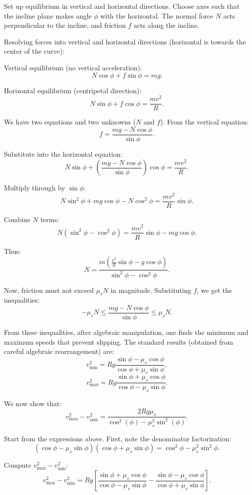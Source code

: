 \documentclass{article}
\begin{document}
Set up equilibrium in vertical and horizontal directions. Choose axes such that the incline plane makes angle $\phi$ with the horizontal. The normal force $N$ acts perpendicular to the incline, and friction $f$ acts along the incline.

Resolving forces into vertical and horizontal directions (horizontal is towards the center of the curve):

Vertical equilibrium (no vertical acceleration):
\[
N\cos\phi + f\sin\phi = mg.
\]

Horizontal equilibrium (centripetal direction):
\[
N\sin\phi + f\cos\phi = \frac{m v^2}{R}.
\]

We have two equations and two unknowns ($N$ and $f$). From the vertical equation:
\[
f = \frac{mg - N\cos\phi}{\sin\phi}.
\]

Substitute into the horizontal equation:
\[
N\sin\phi + \left(\frac{mg - N\cos\phi}{\sin\phi}\right)\cos\phi = \frac{m v^2}{R}.
\]

Multiply through by $\sin\phi$:
\[
N\sin^2\phi + mg\cos\phi - N\cos^2\phi = \frac{m v^2}{R}\sin\phi.
\]

Combine $N$ terms:
\[
N(\sin^2\phi - \cos^2\phi) = \frac{m v^2}{R}\sin\phi - mg\cos\phi.
\]

Thus:
\[
N = \frac{m\left(\frac{v^2}{R}\sin\phi - g\cos\phi\right)}{\sin^2\phi - \cos^2\phi}.
\]

Now, friction must not exceed $\mu_s N$ in magnitude. Substituting $f$, we get the inequalities:
\[
-\mu_s N \leq \frac{mg - N\cos\phi}{\sin\phi} \leq \mu_s N.
\]

From these inequalities, after algebraic manipulation, one finds the minimum and maximum speeds that prevent slipping. The standard results (obtained from careful algebraic rearrangement) are:
\[
v_{\min}^2 = Rg \frac{\sin\phi - \mu_s \cos\phi}{\cos\phi + \mu_s \sin\phi},
\]
\[
v_{\max}^2 = Rg \frac{\sin\phi + \mu_s \cos\phi}{\cos\phi - \mu_s \sin\phi}.
\]

We now show that:
\[
v_{\max}^2 - v_{\min}^2 = \frac{2 R g \mu_s}{\cos^2(\phi) - \mu_s^2 \sin^2(\phi)}.
\]

Start from the expressions above. First, note the denominator factorization:
\[
(\cos\phi - \mu_s \sin\phi)(\cos\phi + \mu_s \sin\phi) = \cos^2\phi - \mu_s^2 \sin^2\phi.
\]

Compute $v_{\max}^2 - v_{\min}^2$:
\[
v_{\max}^2 - v_{\min}^2 = Rg\left[\frac{\sin\phi + \mu_s \cos\phi}{\cos\phi - \mu_s \sin\phi} - \frac{\sin\phi - \mu_s \cos\phi}{\cos\phi + \mu_s \sin\phi}\right].
\]
\end{document}

